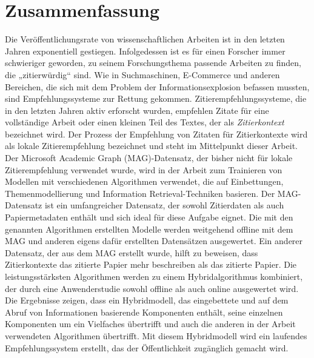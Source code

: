 \chapter*{Zusammenfassung}
Die Veröffentlichungsrate von wissenschaftlichen Arbeiten ist in den letzten Jahren exponentiell gestiegen. Infolgedessen ist es für einen Forscher immer schwieriger geworden, zu seinem Forschungsthema passende Arbeiten zu finden, die „zitierwürdig“ sind. Wie in Suchmaschinen, E-Commerce und anderen Bereichen, die sich mit dem Problem der Informationsexplosion befassen mussten, sind Empfehlungssysteme zur Rettung gekommen. Zitierempfehlungssysteme, die in den letzten Jahren aktiv erforscht wurden, empfehlen Zitate für eine vollständige Arbeit oder einen kleinen Teil des Textes, der als \textit{Zitierkontext} bezeichnet wird. Der Prozess der Empfehlung von Zitaten für Zitierkontexte wird als lokale Zitierempfehlung bezeichnet und steht im Mittelpunkt dieser Arbeit.
Der Microsoft Academic Graph (MAG)-Datensatz, der bisher nicht für lokale Zitierempfehlung verwendet wurde, wird in der Arbeit zum Trainieren von Modellen mit verschiedenen Algorithmen verwendet, die auf Einbettungen, Themenmodellierung und Information Retrieval-Techniken basieren. Der MAG-Datensatz ist ein umfangreicher Datensatz, der sowohl Zitierdaten als auch Papiermetadaten enthält und sich ideal für diese Aufgabe eignet.
Die mit den genannten Algorithmen erstellten Modelle werden weitgehend offline mit dem MAG und anderen eigens dafür erstellten Datensätzen ausgewertet. Ein anderer Datensatz, der aus dem MAG erstellt wurde, hilft zu beweisen, dass Zitierkontexte das zitierte Papier mehr beschreiben als das zitierte Papier.
Die leistungsstärksten Algorithmen werden zu einem Hybridalgorithmus kombiniert, der durch eine Anwenderstudie sowohl offline als auch online ausgewertet wird. Die Ergebnisse zeigen, dass ein Hybridmodell, das eingebettete und auf dem Abruf von Informationen basierende Komponenten enthält, seine einzelnen Komponenten um ein Vielfaches übertrifft und auch die anderen in der Arbeit verwendeten Algorithmen übertrifft. Mit diesem Hybridmodell wird ein laufendes Empfehlungssystem erstellt, das der Öffentlichkeit zugänglich gemacht wird.